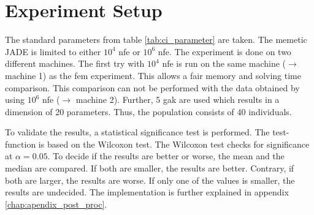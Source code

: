 \documentclass[./\jobname.tex]{subfiles}
\begin{document}
\section{Experiment Setup}
The standard parameters from table \ref{tab:ci_parameter} are taken. The memetic JADE is limited to either $10^4$ \gls{nfe} or $10^6$ \gls{nfe}. The experiment is done on two different machines. The first try with $10^4$ \gls{nfe} is run on the same machine ($\rightarrow$ machine 1) as the \gls{fem} experiment. This allows a fair memory and solving time comparison. This comparison can not be performed with the data obtained by using $10^6$ \gls{nfe} ($\rightarrow$ machine 2). Further, 5 \gls{gak} are used which results in a dimension of 20 parameters. Thus, the population consists of 40 individuals. 

To validate the results, a statistical significance test is performed. The test-function is based on the Wilcoxon test. The Wilcoxon test checks for significance at $\alpha = 0.05$. To decide if the results are better or worse, the mean and the median are compared. If both are smaller, the results are better. Contrary, if both are larger, the results are worse. If only one of the values is smaller, the results are undecided. The implementation is further explained in appendix \ref{chap:apendix_post_proc}. 
\end{document}
